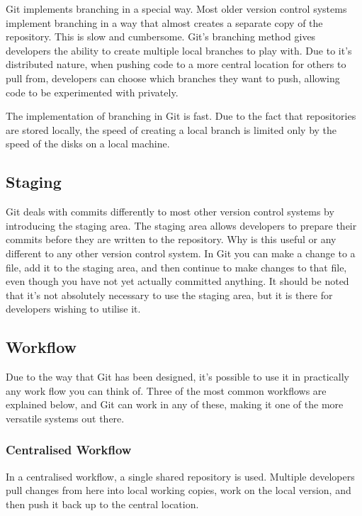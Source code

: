 Git implements branching in a special way.  Most older version control systems implement branching in a way that almost creates a separate copy of the repository.  This is slow and cumbersome.  Git's branching method gives developers the ability to create multiple local branches to play with.  Due to it's distributed nature, when pushing code to a more central location for others to pull from, developers can choose which branches they want to push, allowing code to be experimented with privately.

The implementation of branching in Git is fast.  Due to the fact that repositories are stored locally, the speed of creating a local branch is limited only by the speed of the disks on a local machine.

\subsection{Staging}

Git deals with commits differently to most other version control systems by introducing the staging area.  The staging area allows developers to prepare their commits before they are written to the repository.  Why is this useful or any different to any other version control system.  In Git you can make a change to a file, add it to the staging area, and then continue to make changes to that file, even though you have not yet actually committed anything.
It should be noted that it's not absolutely necessary to use the staging area, but it is there for developers wishing to utilise it.

\subsection{Workflow}

Due to the way that Git has been designed, it's possible to use it in practically any work flow you can think of.  Three of the most common workflows are explained below, and Git can work in any of these, making it one of the more versatile systems out there.

\subsubsection{Centralised Workflow}

In a centralised workflow, a single shared repository is used.  Multiple developers pull changes from here into local working copies, work on the local version, and then push it back up to the central location.  

